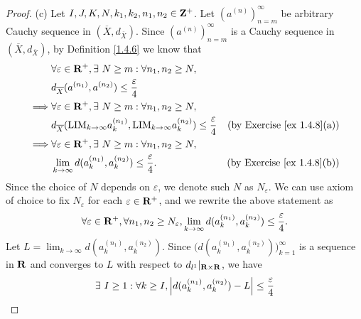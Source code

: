 \begin{proof}{(c)}
    Let \(I, J, K, N, k_1, k_2, n_1, n_2 \in \mathbf{Z}^+\).
    Let \((a^{(n)})_{n = m}^\infty\) be arbitrary Cauchy sequence in \((\overline{X}, d_{\overline{X}})\).
    Since \((a^{(n)})_{n = m}^\infty\) is a Cauchy sequence in \((\overline{X}, d_{\overline{X}})\), by Definition \ref{1.4.6} we know that
    \begin{align*}
                 & \forall \varepsilon \in \mathbf{R}^+, \exists\ N \geq m : \forall n_1, n_2 \geq N,                                                                                         \\
                 & d_{\overline{X}}(a^{(n_1)}, a^{(n_2)}) \leq \frac{\varepsilon}{4}                                                                                                  \\
        \implies & \forall \varepsilon \in \mathbf{R}^+, \exists\ N \geq m : \forall n_1, n_2 \geq N,                                                                                         \\
                 & d_{\overline{X}}(\text{LIM}_{k \to \infty} a_k^{(n_1)}, \text{LIM}_{k \to \infty} a_k^{(n_2)}) \leq \frac{\varepsilon}{4} & \text{(by Exercise \ref{ex 1.4.8}(a))} \\
        \implies & \forall \varepsilon \in \mathbf{R}^+, \exists\ N \geq m : \forall n_1, n_2 \geq N,                                                                                         \\
                 & \lim_{k \to \infty} d(a_k^{(n_1)}, a_k^{(n_2)}) \leq \frac{\varepsilon}{4}.                                               & \text{(by Exercise \ref{ex 1.4.8}(b))}
    \end{align*}
    Since the choice of \(N\) depends on \(\varepsilon\), we denote such \(N\) as \(N_\varepsilon\).
    We can use axiom of choice to fix \(N_\varepsilon\) for each \(\varepsilon \in \mathbf{R}^+\), and we rewrite the above statement as
    \[
        \forall \varepsilon \in \mathbf{R}^+, \forall n_1, n_2 \geq N_\varepsilon, \lim_{k \to \infty} d(a_k^{(n_1)}, a_k^{(n_2)}) \leq \frac{\varepsilon}{4}.
    \]
    Let \(L = \lim_{k \to \infty} d(a_k^{(n_1)}, a_k^{(n_2)})\).
    Since \(\Big(d(a_k^{(n_1)}, a_k^{(n_2)})\Big)_{k = 1}^\infty\) is a sequence in \(\mathbf{R}\) and converges to \(L\) with respect to \(d_{l^1}|_{\mathbf{R} \times \mathbf{R}}\), we have
    \begin{align*}
                 & \exists\ I \geq 1 : \forall k \geq I, \abs{d(a_k^{(n_1)}, a_k^{(n_2)}) - L} \leq \frac{\varepsilon}{4}                                                                                            \\

\end{align*}
\end{proof}
